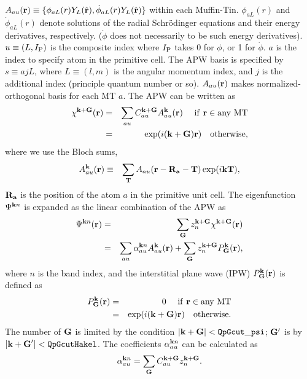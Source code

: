 \documentclass[a4paper,10pt,epsf,fleqn]{article}
\begin{document}
{{{\begin{thebibliography}{00}
\noindent $A_{au}({\bf r})\equiv \{ \phi_{aL}(r) Y_L(\hat{\bf r}),\dot{\phi}_{aL}(r) Y_L(\hat{\bf r}) \}$
within each Muffin-Tin.
$\phi_{aL}(r)$ and $\dot{\phi}_{aL}(r)$ denote solutions of
the radial Schr\"odinger equations and their energy derivatives, respectively.
($\dot{\phi}$ does not necessarily to be such energy derivatives).
$u \equiv(L, I_{\rm P})$ is the composite index
where $I_{\rm P}$ takes 0 for $\phi$, or 1 for $\dot{\phi}$.
$a$ is the index to specify atom in the primitive cell.
The APW basis is specified by $s \equiv {ajL}$, where
$L\equiv(l,m)$ is the angular momentum index, and $j$ is the additional
index (principle quantum number or so). 
$A_{au}({\bf r})$ makes normalized-orthogonal basis for each MT $a$.
The APW can be written as
\begin{eqnarray}
\label{coeff}
\chi^{\bf k+G}({\bf r}) &=& \sum_{a u} C^{\bf k+G}_{a u} A^{\bf k}_{a u}({\bf r})   \ \ \ {\rm \ if \ {\bf r} \in any \ MT} \nonumber \\
        &=&   \exp(i ({\bf k+G}){\bf r}) \ \ \ {\rm otherwise},
\end{eqnarray}
where we use the Bloch sums,
\begin{eqnarray}
A^{\bf k}_{a u}({\bf r}) &\equiv& \sum_{\bf T} A_{a u}({\bf r-R_a-T}) \exp(i {\bf kT}),
\end{eqnarray}
${\bf R_a}$ is the position of the atom $a$ in the primitive unit cell.
The eigenfunction $\Psi^{{\bf k}n}$ is expanded as the linear combination of the APW as
\begin{eqnarray}
\label{eigenfunction}
\Psi^{{\bf k}n}({\bf r}) &=& \sum_{\bf G} z^{\bf k+G}_n \chi^{\bf k+G}({\bf r}) \\
&=& \sum_{a u} \alpha^{{\bf k}n}_{au} A^{\bf k}_{a u}({\bf r})
  + \sum_{\bf G} z^{\bf k+G}_n P^{\bf k}_{\bf G}({\bf r}),
\end{eqnarray}
where $n$ is the band index, 
and the interstitial plane wave (IPW) $P^{\bf k}_{\bf G}({\bf r})$ 
is defined as
\begin{eqnarray}
P^{\bf k}_{\bf G}({\bf r}) &=& 0  \ \ \ {\rm \ if \ {\bf r} \in any \ MT} \nonumber \\
        &=&   \exp (i ({\bf k+G}) {\bf r}) \ \ \ {\rm otherwise}.
\end{eqnarray}
The number of ${\bf G}$ is limited by the condition
$|{\bf k+G}|< {\tt QpGcut\_psi}$;
${\bf G}'$ is by $|{\bf k+G}'|< {\tt  QpGcutHakel}$.
The coefficients $\alpha^{{\bf k}n}_{au}$ can be calculated as
\begin{eqnarray}
\alpha^{{\bf k}n}_{au} = \sum_{\bf G} C^{{\bf k+G}}_{a u} z^{\bf k+G}_n.
\end{eqnarray}




\end{thebibliography}}}}
\end{document}
